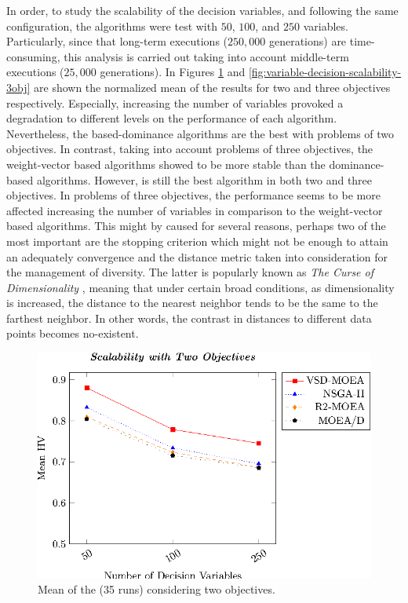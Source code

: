 In order, to study the scalability of the decision variables, and following the same configuration, the algorithms were test with $50$, $100$, and $250$ variables.
%
Particularly, since that long-term executions ($250,000$ generations) are time-consuming, this analysis is carried out taking into account middle-term executions ($25,000$ generations).
%
In Figures \ref{fig:variable-decision-scalability-2obj} and \ref{fig:variable-decision-scalability-3obj} are shown the normalized mean of the \HV{} results for two and three objectives respectively.
%
Especially, increasing the number of variables provoked a degradation to different levels on the performance of each algorithm.
%
Nevertheless, the based-dominance algorithms are the best with problems of two objectives.
%
In contrast, taking into account problems of three objectives, the weight-vector based algorithms showed to be more stable than the dominance-based algorithms.
%
%
However, \VSDMOEA{} is still the best algorithm in both two and three objectives.
% 
In problems of three objectives, the \VSDMOEA{} performance seems to be more affected increasing the number of variables in comparison to the weight-vector based algorithms.
%
This might by caused for several reasons, perhaps two of the most important are the stopping criterion which might not be enough to attain an adequately convergence and the distance metric taken into consideration for the management of diversity.
%
The latter is popularly known as \textit{The Curse of Dimensionality} \cite{trunk1979problem, beyer1999nearest}, meaning that under certain broad conditions, as dimensionality is increased, the distance to the nearest neighbor tends to be the same to the farthest neighbor.
%
In other words, the contrast in distances to different data points becomes no-existent.


\begin{figure}[t]
\centering
\includegraphics[]{Images/Graphic-Scalability-2obj_tikz-figure0.eps}
%
\caption{Mean of the \HV{} (35 runs) considering two objectives.}\label{fig:variable-decision-scalability-2obj}
\end{figure}

